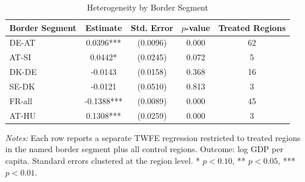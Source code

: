 \begin{table}[htbp]
\centering
\caption{Heterogeneity by Border Segment}
\label{tab:heterogeneity}
\begin{tabular}{lcccc}
\toprule
Border Segment & Estimate & Std. Error & $p$-value & Treated Regions \\
\midrule
DE-AT & 0.0396*** & (0.0096) & 0.000 & 62 \\
AT-SI & 0.0442* & (0.0245) & 0.072 & 5 \\
DK-DE & -0.0143 & (0.0158) & 0.368 & 16 \\
SE-DK & -0.0121 & (0.0510) & 0.813 & 3 \\
FR-all & -0.1388*** & (0.0089) & 0.000 & 45 \\
AT-HU & 0.1308*** & (0.0259) & 0.000 & 3 \\
\bottomrule
\end{tabular}
\begin{tablenotes}[flushleft]
\small
\item \textit{Notes:} Each row reports a separate TWFE regression restricted to treated regions
in the named border segment plus all control regions. Outcome: log GDP per capita.
Standard errors clustered at the region level.
* $p<0.10$, ** $p<0.05$, *** $p<0.01$.
\end{tablenotes}
\end{table}
